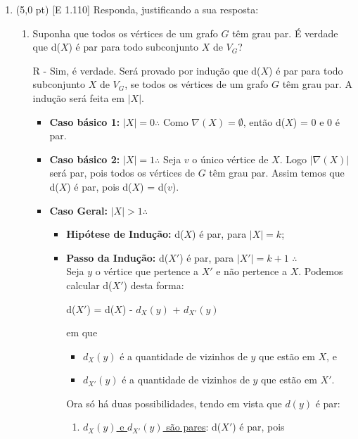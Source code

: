 \documentclass[12pt,a4paper,oneside]{article}
\begin{document}
\begin{enumerate}

	\item (5,0 pt) [E 1.110] Responda, justificando a sua resposta:
		\begin{enumerate}
			\item Suponha que todos os vértices de um grafo $G$ têm grau par. É verdade que d($X$) é par para todo subconjunto $X$ de $V_G$?
			
	\vspace{0.3cm}
	
	{\color{verde}
		R - Sim, é verdade. Será provado por indução que d($X$) é par para todo subconjunto $X$ de $V_G$, se todos os vértices de um grafo $G$ têm grau par. A indução será feita em $|X|$.
		\begin{itemize}
			\item {\bf Caso básico 1:} $|X| = 0 \therefore$ Como $\nabla(X) = \emptyset$, então d($X$) = 0 e 0 é par.
			\item {\bf Caso básico 2:} $|X| = 1 \therefore$ Seja $v$ o único vértice de $X$. Logo $|\nabla(X)|$ será par, pois todos os vértices de $G$ têm grau par. Assim temos que d($X$) é par, pois d($X$) = d($v$).
			\item {\bf Caso Geral:} $|X| > 1 \therefore$ 
				\begin{itemize}
					\item {\bf Hipótese de Indução:} d($X$) é par, para $|X| = k$;
					\item {\bf Passo da Indução:} d($X'$) é par, para $|X'| = k + 1$ $\therefore$ \\
					Seja $y$ o vértice que pertence a $X'$ e não pertence a $X$. Podemos calcular d($X'$) desta forma:
					\begin{center}
						d($X'$) = d($X$) - $d_X(y)$ + $d_{X'}(y)$
					\end{center}
					em que 
					\begin{itemize}
						\item $d_X(y)$ é a quantidade de vizinhos de $y$ que estão em $X$, e
						\item $d_{X'}(y)$ é a quantidade de vizinhos de $y$ que estão em $X'$.
					\end{itemize}  
					Ora só há duas possibilidades, tendo em vista que $d(y)$ é par:
					\begin{enumerate}
						\item \underline{$d_{X}(y)$ e $d_{X'}(y)$ são pares}: d($X'$) é par, pois 
						\begin{center}

\end{center}
\end{enumerate}
\end{itemize}
\end{itemize}}
\end{enumerate}
\end{enumerate}
\end{document}
